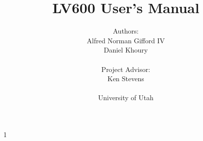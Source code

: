 \documentclass[letterpaper, 12 pt]{report}
\begin{document}
\title{LV600 User's Manual}
\author{Authors: \\ Alfred Norman Gifford IV \\ Daniel Khoury \\ \\ Project Advisor: \\ Ken Stevens \\ \\ University of Utah}
\maketitle
\pagestyle{empty}

\tableofcontents
\newpage

1













%

\end{document}
